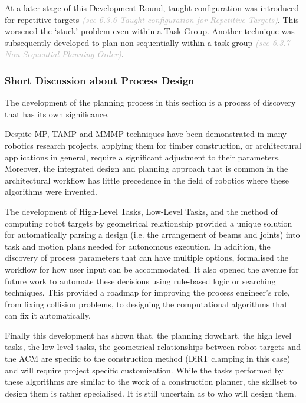 At a later stage of this Development Round, taught configuration was introduced for repetitive targets\textit{\textcolor[HTML]{B7B7B7}{ (see \uline{6.3.6 Taught configuration for Repetitive Targets})}}. This worsened the ‘stuck’ problem even within a Task Group. Another technique was subsequently developed to plan non-sequentially within a task group \textit{\textcolor[HTML]{B7B7B7}{(see \uline{6.3.7 Non-Sequential Planning Order})}}.

\subsubsection{Short Discussion about Process Design}

The development of the planning process in this section is a process of discovery that has its own significance. 

Despite MP, TAMP and MMMP techniques have been demonstrated in many robotics research projects, applying them for timber construction, or architectural applications in general, require a significant adjustment to their parameters. Moreover, the integrated design and planning approach that is common in the architectural workflow has little precedence in the field of robotics where these algorithms were invented.

The development of High-Level Tasks, Low-Level Tasks, and the method of computing robot targets by geometrical relationship provided a unique solution for automatically parsing a design (i.e. the arrangement of beams and joints) into task and motion plans needed for autonomous execution. In addition, the discovery of process parameters that can have multiple options, formalised the workflow for how user input can be accommodated. It also opened the avenue for future work to automate these decisions using rule-based logic or searching techniques. This provided a roadmap for improving the process engineer’s role, from fixing collision problems, to designing the computational algorithms that can fix it automatically. 

Finally this development has shown that, the planning flowchart, the high level tasks, the low level tasks, the geometrical relationships between robot targets and the ACM are specific to the construction method (DiRT clamping in this case) and will require project specific customization. While the tasks performed by these algorithms are similar to the work of a construction planner, the skillset to design them is rather specialised. It is still uncertain as to who will design them.


